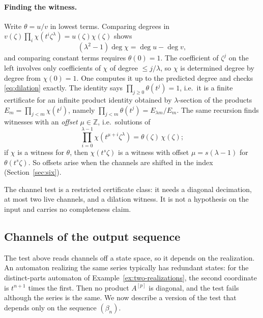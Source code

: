\documentclass[11pt,a4paper]{article}
\theoremstyle{plain}
\theoremstyle{definition}
\theoremstyle{remark}
\begin{document}
\paragraph{Finding the witness.} Write $\theta=u/v$ in lowest terms. Comparing
degrees in $v(\zeta)\prod_i\chi(t^i\zeta^\lambda)=u(\zeta)\chi(\zeta)$ shows
\[
  (\lambda^2-1)\deg\chi=\deg u-\deg v,
\]
and comparing constant terms requires $\theta(0)=1$. The coefficient of
$\zeta^j$ on the left involves only coefficients of $\chi$ of degree
$\le j/\lambda$, so $\chi$ is determined degree by degree from $\chi(0)=1$.
One computes it up to the predicted degree and checks \eqref{eq:dilation}
exactly. The identity says $\prod_{j\ge0}\theta(t^j)=1$, i.e.\ it is a
finite certificate for an infinite product identity obtained by $\lambda$-section
of the products $E_m=\prod_{j<m}\chi(t^j)$, namely
$\prod_{j<m}\theta(t^j)=E_{\lambda m}/E_m$. The same recursion finds witnesses
with an \emph{offset} $\mu\in\mathbb Z$, i.e.\ solutions of
\begin{equation}\label{eq:dilation-mu}
  \prod_{i=0}^{\lambda-1}\chi(t^{\mu+i}\zeta^\lambda)=\theta(\zeta)\,\chi(\zeta);
\end{equation}
if $\chi$ is a witness for $\theta$, then $\chi(t^s\zeta)$ is a witness with
offset $\mu=s(\lambda-1)$ for $\theta(t^s\zeta)$. So offsets arise when the
channels are shifted in the index (Section~\ref{sec:six}).

The channel test is a restricted certificate class: it needs a diagonal
decimation, at most two live channels, and a dilation witness. It is not a
hypothesis on the input and carries no completeness claim.

\subsection{Channels of the output sequence}\label{sec:intrinsic}
The test above reads channels off a state space, so it depends on the
realization. An automaton realizing the same series typically has redundant
states: for the distinct-parts automaton of Example~\ref{ex:two-realizations},
the second coordinate is $t^{n+1}$ times the first. Then no product $A^{[p]}$ is
diagonal, and the test fails although the series is the same. We now describe a
version of the test that depends only on the sequence $(\beta_n)$.
\end{document}
